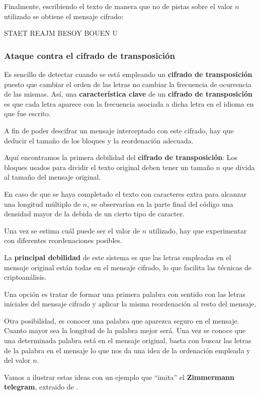\documentclass[nochap]{apuntesURJC}
\begin{document}
Finalmente, escribiendo el texto de manera que no de pistas sobre el valor $n$ utilizado se obtiene el mensaje cifrado:

\begin{center}
STAET REAJM BESOY BOUEN U
\end{center}

\subsubsection{Ataque contra el cifrado de transposición}
Es sencillo de detectar cuando se está empleando un \textbf{cifrado de transposición} puesto que cambiar el orden de las letras no cambiar la frecuencia de ocurrencia de las mismas. Así, una \textbf{característica clave} de un \textbf{cifrado de transposición} es que cada letra aparece con la frecuencia asociada a dicha letra en el idioma en que fue escrito.

A fin de poder descifrar un mensaje interceptado con este cifrado, hay que deducir el tamaño de los bloques y la reordenación adecuada.

Aquí encontramos la primera debilidad del \textbf{cifrado de transposición}: Los bloques usados para dividir el texto original deben tener un tamaño $n$ que divida al tamaño del mensaje original.

En caso de que se haya completado el texto con caracteres extra para alcanzar una longitud múltiplo de $n$, se observarían en la parte final del código una densidad mayor de la debida de un cierto tipo de caracter.

Una vez se estima cuál puede ser el valor de $n$ utilizado, hay que experimentar con diferentes reordenaciones posibles.

La \textbf{principal debilidad} de este sistema es que las letras empleadas en el mensaje original están todas en el mensaje cifrado, lo que facilita las técnicas de criptoanálisis.

Una opción es tratar de formar una primera palabra con sentido con las letras iniciales del mensaje cifrado y aplicar la misma reordenación al resto del mensaje.

Otra posibilidad, es conocer una palabra que aparezca seguro en el mensaje. Cuanto mayor sea la longitud de la palabra mejor será. Una vez se conoce que una determinada palabra está en el mensaje original, basta con buscar las letras de la palabra en el mensaje lo que nos da una idea de la ordenación empleada y del valor $n$.

Vamos a ilustrar estas ideas con un ejemplo que ``imita'' el \textbf{Zimmermann telegram}, extraido de \cite{Wikipedia:ZimmermanExample}.
\end{document}
